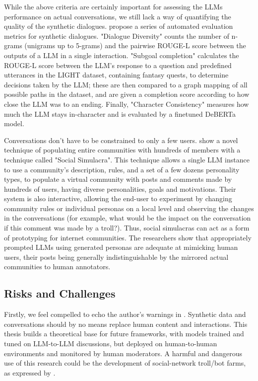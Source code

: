 While the above criteria are certainly important for assessing the LLMs performance on actual conversations, we still lack a way of quantifying the quality of the synthetic dialogues. \citet{ulmer2024bootstrappingllmbasedtaskorienteddialogue} propose a series of automated evaluation metrics for synthetic dialogues. "Dialogue Diversity" counts the number of n-grams (unigrams up to 5-grams) and the pairwise ROUGE-L \cite{lin-2004-rouge} score between the outputs of a LLM in a single interaction. "Subgoal completion" calculates the ROUGE-L score between the LLM's response to a question and predefined utterances in the LIGHT \cite{urbanek-etal-2019-learning} dataset, containing fantasy quests, to determine decisions taken by the LLM; these are then compared to a graph mapping of all possible paths in the dataset, and are given a completion score according to how close the LLM was to an ending. Finally, "Character Consistency" measures how much the LLM stays in-character and is evaluated by a finetuned DeBERTa \cite{he2023debertav3improvingdebertausing} model.

Conversations don't have to be constrained to only a few users. \cite{park2022socialsimulacracreatingpopulated} show a novel technique of populating entire communities with hundreds of members with a technique called "Social Simulacra". This technique allows a single LLM instance to use a community's description, rules, and a set of a few dozens personality types, to populate a virtual community with posts and comments made by hundreds of users, having diverse personalities, goals and motivations. Their system is also interactive, allowing the end-user to experiment by changing community rules or individual personas on a local level and observing the changes in the conversations (for example, what would be the impact on the conversation if this comment was made by a troll?). Thus, social simulacras can act as a form of prototyping for internet communities. The researchers show that appropriately prompted LLMs using generated personas are adequate at mimicking human users, their posts being generally indistinguishable by the mirrored actual communities to human annotators.  


\subsection{Risks and Challenges}
\label{sec:related:challenges}

Firstly, we feel compelled to echo the author's warnings in \cite{small-polis-llm}. Synthetic data and conversations should by no means replace human content and interactions. This thesis builds a theoretical base for future frameworks, with models trained and tuned on LLM-to-LLM discussions, but deployed on human-to-human environments and monitored by human moderators. A harmful and dangerous use of this research could be the development of social-network troll/bot farms, as expressed by \cite{park2022socialsimulacracreatingpopulated}.

